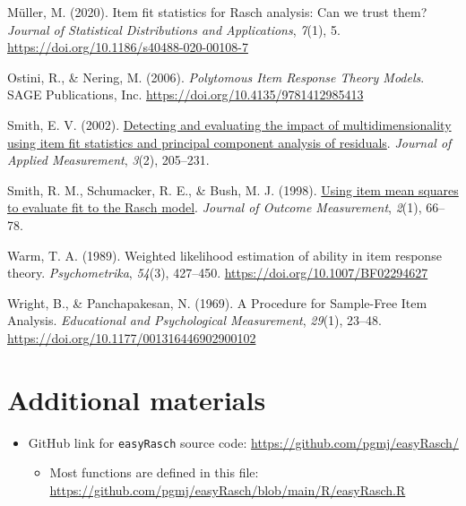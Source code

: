 \documentclass[
  letterpaper,
  DIV=11,
  numbers=noendperiod]{scrartcl}
\providecommand{\tightlist}{%
  \setlength{\itemsep}{0pt}\setlength{\parskip}{0pt}}\usepackage{longtable,booktabs,array}
\newlength{\cslhangindent}
\newenvironment{CSLReferences}[2] %
 {\begin{list}{}{%
  \setlength{\itemindent}{0pt}
  \setlength{\leftmargin}{0pt}
  \setlength{\parsep}{0pt}
  \ifodd #1
   \setlength{\leftmargin}{\cslhangindent}
   \setlength{\itemindent}{-1\cslhangindent}
  \fi
  \setlength{\itemsep}{#2\baselineskip}}}
 {\end{list}}
\begin{document}
\begin{CSLReferences}{1}{0}
Müller, M. (2020). Item fit statistics for {Rasch} analysis: Can we
trust them? \emph{Journal of Statistical Distributions and
Applications}, \emph{7}(1), 5.
\url{https://doi.org/10.1186/s40488-020-00108-7}

Ostini, R., \& Nering, M. (2006). \emph{Polytomous {Item} {Response}
{Theory} {Models}}. SAGE Publications, Inc.
\url{https://doi.org/10.4135/9781412985413}

Smith, E. V. (2002).
\href{https://www.ncbi.nlm.nih.gov/pubmed/12011501}{Detecting and
evaluating the impact of multidimensionality using item fit statistics
and principal component analysis of residuals}. \emph{Journal of Applied
Measurement}, \emph{3}(2), 205--231.

Smith, R. M., Schumacker, R. E., \& Bush, M. J. (1998).
\href{https://www.ncbi.nlm.nih.gov/pubmed/9661732}{Using item mean
squares to evaluate fit to the {Rasch} model}. \emph{Journal of Outcome
Measurement}, \emph{2}(1), 66--78.

Warm, T. A. (1989). Weighted likelihood estimation of ability in item
response theory. \emph{Psychometrika}, \emph{54}(3), 427--450.
\url{https://doi.org/10.1007/BF02294627}

Wright, B., \& Panchapakesan, N. (1969). A {Procedure} for
{Sample}-{Free} {Item} {Analysis}. \emph{Educational and Psychological
Measurement}, \emph{29}(1), 23--48.
\url{https://doi.org/10.1177/001316446902900102}

\end{CSLReferences}

\newpage{}

\section{Additional materials}\label{sec-addmat}

\begin{itemize}
\tightlist
\item
  GitHub link for \texttt{easyRasch} source code:
  \url{https://github.com/pgmj/easyRasch/}

  \begin{itemize}
  \tightlist
  \item
    Most functions are defined in this file:
    \url{https://github.com/pgmj/easyRasch/blob/main/R/easyRasch.R}
  \end{itemize}
\end{itemize}
\end{document}
